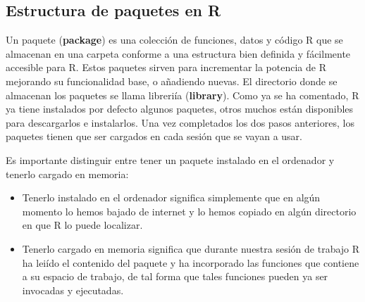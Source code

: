 \subsection{Estructura de paquetes en R}

Un paquete (\textbf{package}) es una colecci\'on de funciones, datos y c\'odigo R que se almacenan en una carpeta 
conforme a una estructura bien definida y f\'acilmente accesible para R.
Estos paquetes sirven para incrementar la potencia de R mejorando su funcionalidad base, o a\~nadiendo 
nuevas. El directorio donde se almacenan los paquetes se llama libreri\'ia (\textbf{library}).
Como ya se ha comentado, R ya tiene instalados por defecto algunos paquetes, otros muchos est\'an disponibles 
para descargarlos e instalarlos. Una vez completados los dos pasos anteriores, los paquetes tienen que ser 
cargados en cada sesi\'on que se vayan a usar.

Es importante distinguir entre tener un paquete instalado en el ordenador y tenerlo cargado en memoria:

\begin{itemize}
    \item Tenerlo instalado en el ordenador significa simplemente que en alg\'un momento lo hemos bajado de internet 
y lo hemos copiado en alg\'un directorio en que R lo puede localizar.
    \item Tenerlo cargado en memoria significa que durante nuestra sesi\'on de trabajo R ha lei\'ido el contenido del 
paquete y ha incorporado las funciones que contiene a su espacio de trabajo, de tal forma que tales funciones 
pueden ya ser invocadas y ejecutadas.
\end{itemize}

